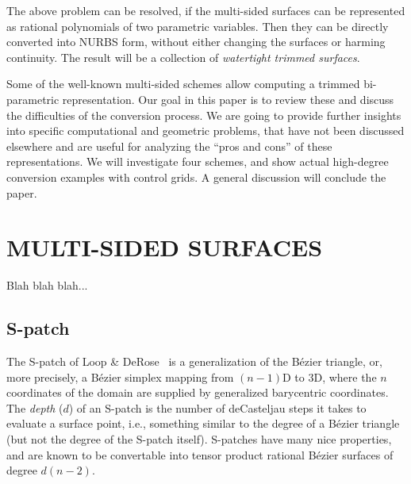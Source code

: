 \documentclass[9pt,academicons]{article}
\begin{document}
The above problem can be resolved, if the multi-sided surfaces can be represented as rational
polynomials of two parametric variables. Then they can be directly converted into
NURBS form, without either changing the surfaces or harming continuity. The result will be
a collection of \emph{watertight trimmed surfaces}.
 
Some of the well-known multi-sided schemes allow computing a trimmed bi-parametric
representation. Our goal in this paper is to review these and discuss the difficulties of
the conversion process. We are going to provide further insights into specific
computational and geometric problems, that have not been discussed elsewhere and are
useful for analyzing the ``pros and cons'' of these representations.
We will investigate four schemes, and show actual high-degree conversion examples with
control grids.
A general discussion will conclude the paper.

\section{MULTI-SIDED SURFACES}
\label{sec:multisided}

Blah blah blah...

\subsection{S-patch}
The S-patch of Loop \& DeRose~\cite{Loop:1989} is a generalization of the B\'ezier triangle, or,
more precisely, a B\'ezier simplex mapping from $(n-1)$D to 3D, where the $n$ coordinates of the
domain are supplied by generalized barycentric coordinates. The \emph{depth} ($d$) of an S-patch
is the number of deCasteljau steps it takes to evaluate a surface point, i.e., something similar
to the degree of a B\'ezier triangle (but not the degree of the S-patch itself).
S-patches have many nice properties, and are known to be convertable into tensor product
rational B\'ezier surfaces of degree $d(n-2)$.
\end{document}
